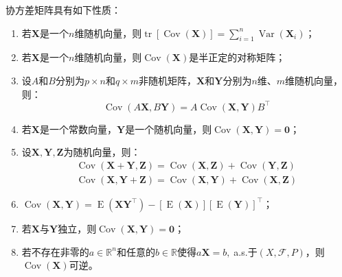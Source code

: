 \begin{property}\label{prop:CovMat}
	协方差矩阵具有如下性质：
	\begin{enumerate}
		\item 若$\mathbf{X}$是一个$n$维随机向量，则$\operatorname{tr}[\operatorname{Cov}(\mathbf{X})]=\sum\limits_{i=1}^{n}\operatorname{Var}(\mathbf{X}_i)$；
		\item 若$\mathbf{X}$是一个$n$维随机向量，则$\operatorname{Cov}(\mathbf{X})$是半正定的对称矩阵；
		\item 设$A$和$B$分别为$p\times n$和$q\times m$非随机矩阵，$\mathbf{X}$和$\mathbf{Y}$分别为$n$维、$m$维随机向量，则：
		\begin{equation*}
			\operatorname{Cov}(A\mathbf{X},B\mathbf{Y})=A\operatorname{Cov}(\mathbf{X},\mathbf{Y})B^{\top}
		\end{equation*}
		\item 若$\mathbf{X}$是一个常数向量，$\mathbf{Y}$是一个随机向量，则$\operatorname{Cov}(\mathbf{X},\mathbf{Y})=\mathbf{0}$；
		\item 设$\mathbf{X},\mathbf{Y},\mathbf{Z}$为随机向量，则：
		\begin{gather*}
			\operatorname{Cov}(\mathbf{X}+\mathbf{Y},\mathbf{Z})=\operatorname{Cov}(\mathbf{X},\mathbf{Z})+\operatorname{Cov}(\mathbf{Y},\mathbf{Z}) \\
			\operatorname{Cov}(\mathbf{X},\mathbf{Y}+\mathbf{Z})=\operatorname{Cov}(\mathbf{X},\mathbf{Y})+\operatorname{Cov}(\mathbf{X},\mathbf{Z})
		\end{gather*}
		\item $\operatorname{Cov}(\mathbf{X},\mathbf{Y})=\operatorname{E}(\mathbf{X}\mathbf{Y}^{\top})-[\operatorname{E}(\mathbf{X})][\operatorname{E}(\mathbf{Y})]^{\top}$；
		\item 若$\mathbf{X}$与$\mathbf{Y}$独立，则$\operatorname{Cov}(\mathbf{X},\mathbf{Y})=\mathbf{0}$；
		\item 若不存在非零的$a\in\mathbb{R}^{n}$和任意的$b\in\mathbb{R}$使得$a\mathbf{X}=b,\;$a.s.于$(X,\mathscr{F},P)$，则$\operatorname{Cov}(\mathbf{X})$可逆。
	\end{enumerate}
\end{property}
